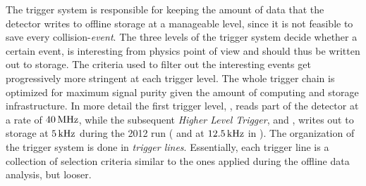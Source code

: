 
The trigger system is responsible for keeping the amount of data that the detector writes to offline storage
at a manageable level, since it is not feasible to save every collision-{\it event}. The three levels of
the \lhcb trigger system decide whether a certain event, is interesting from physics point
of view and should thus be written out to storage. The criteria used to filter out the interesting events
get progressively more stringent at each trigger level. The whole trigger chain is optimized for maximum
signal purity given the amount of computing and storage infrastructure. In more detail the first trigger
level, \lzero, reads part of the detector at a rate of $40{\rm \,MHz}$, while the subsequent {\it Higher Level Trigger},
\hltone and \hlttwo, writes out to storage at $5{\rm \,kHz}$ during the 2012 run ( and at $12.5{\rm \,kHz}$ in \runtwo).
The organization of the trigger system is done in {\it trigger lines}. Essentially, each trigger line is
a collection of selection criteria similar to the ones applied during the offline data analysis, but looser.

